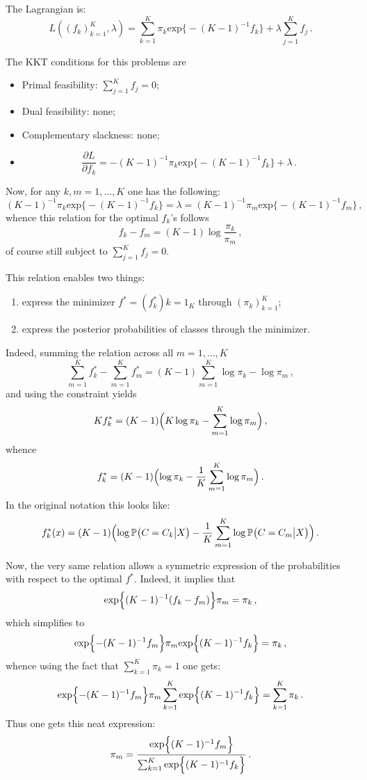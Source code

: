 \documentclass[a4paper]{article}
\newcommand{\pr}{\mathbb{P}}
\begin{document}
The Lagrangian is:
\[
L((f_k)_{k=1}^K, \lambda)
= \sum_{k=1}^K \pi_k \text{exp}\bigl\{ -(K-1)^{-1} f_k \bigr\} + \lambda \sum_{j=1}^K f_j\,.
\]

The KKT conditions for this problems are \begin{itemize}
	\item Primal feasibility: $\sum_{j=1}^K f_j = 0$;
	\item Dual feasibility: none;
	\item Complementary slackness: none;
	\item
	\[
	\frac{\partial L}{\partial f_k}
		= -(K-1)^{-1} \pi_k \text{exp}\bigl\{ -(K-1)^{-1} f_k \bigr\} + \lambda \,.
	\]
\end{itemize}
Now, for any $k,m=1,\ldots,K$ one has the following:
\[
(K-1)^{-1} \pi_k \text{exp}\bigl\{ -(K-1)^{-1} f_k \bigr\}
= \lambda
= (K-1)^{-1} \pi_m \text{exp}\bigl\{ -(K-1)^{-1} f_m \bigr\}\,,
\]
whence this relation for the optimal $f_k$'s follows
\[ f_k - f_m = (K-1)\log\frac{\pi_k}{\pi_m} \,, \]
of course still subject to $\sum_{j=1}^K f_j = 0$.

This relation enables two things: \begin{enumerate}
	\item express the minimizer $f^* = (f^*_k){k=1}_K$ through $(\pi_k)_{k=1}^K$;
	\item express the posterior probabilities of classes through the minimizer.
\end{enumerate}
Indeed, summing the relation across all $m=1,\ldots,K$ 
\[ \sum_{m=1}^K f^*_k - \sum_{m=1}^K f^*_m = (K-1)\sum_{m=1}^K \log \pi_k - \log \pi_m\,, \]
and using the constraint yields
\[ K f^*_k = (K-1) \Bigl( K \log \pi_k - \sum_{m=1}^K \log \pi_m \Bigr)\,, \]
whence
\[ f^*_k = (K-1) \Bigl( \log \pi_k - \frac{1}{K}\sum_{m=1}^K \log \pi_m \Bigr)\,. \]
In the original notation this looks like:
\[
f^*_k(x)
= (K-1) \Bigl( \log \pr\bigl( C = C_k \big\vert X \bigr)
	- \frac{1}{K}\sum_{m=1}^K \log \pr\bigl( C = C_m \big\vert X \bigr) \Bigr)
\,.\]

Now, the very same relation allows a symmetric expression of the probabilities
with respect to the optimal $f^*$. Indeed, it implies that 
\[ \text{exp}\Bigl\{ (K-1)^{-1}(f_k - f_m) \Bigr\}\pi_m = \pi_k \,, \]
which simplifies to
\[ \text{exp}\Bigl\{ -(K-1)^{-1}f_m \Bigr\} \pi_m \text{exp}\Bigl\{ (K-1)^{-1}f_k \Bigr\} = \pi_k \,, \]
whence using the fact that $\sum_{k=1}^K \pi_k = 1$ one gets:
\[
\text{exp}\Bigl\{ -(K-1)^{-1}f_m \Bigr\} \pi_m
	\sum_{k=1}^K \text{exp}\Bigl\{ (K-1)^{-1}f_k \Bigr\} = \sum_{k=1}^K \pi_k \,.
\]
Thus one gets this neat expression:
\[
\pi_m = \frac{\text{exp}\Bigl\{ (K-1)^{-1}f_m \Bigr\} }{
	\sum_{k=1}^K \text{exp}\Bigl\{ (K-1)^{-1}f_k \Bigr\}} \,.
\]
\end{document}
